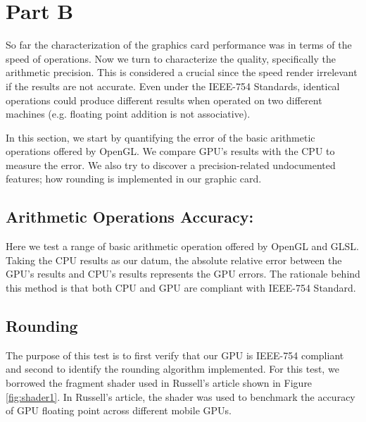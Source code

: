\section{Part B}
So far the characterization of the graphics card performance was in terms of the speed of operations. Now we turn to characterize the quality, specifically the arithmetic precision. This is considered a crucial since the speed render irrelevant if the results are not accurate. Even under the IEEE-754 Standards, identical operations could produce different results when operated on two different machines (e.g. floating point addition is not associative). 

In this section, we start by quantifying the error of the basic arithmetic operations offered by OpenGL. We compare GPU's results with the CPU to measure the error. We also try to discover a precision-related undocumented features; how rounding is implemented in our graphic card. 

\subsection{Arithmetic Operations Accuracy:}
Here we test a range of basic arithmetic operation offered by OpenGL and GLSL. Taking the CPU results as our datum, the absolute relative error between the GPU's results and CPU's results represents the GPU errors. The rationale behind this method is that both CPU and GPU are compliant with IEEE-754 Standard. %


\subsection{Rounding}
The purpose of this test is to first verify that our GPU is IEEE-754 compliant and second to identify the rounding algorithm implemented. For this test, we borrowed the fragment shader used in Russell's article \cite{stuart2013mobile} shown in Figure \ref{fig:shader1}. In Russell's article, the shader was used to benchmark the accuracy of GPU floating point across different mobile GPUs. 

